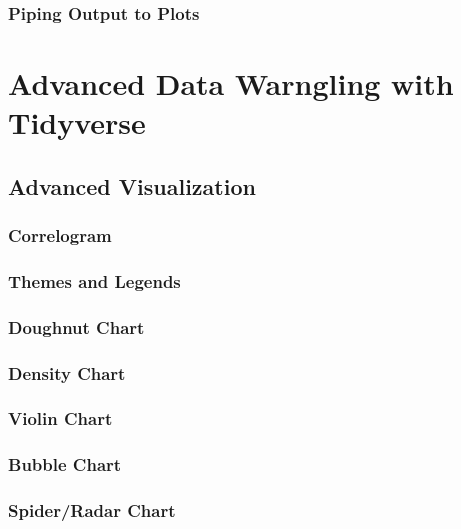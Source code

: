\documentclass[
]{book}
\begin{document}
\hypertarget{piping-output-to-plots}{%
\subsection{Piping Output to Plots}\label{piping-output-to-plots}}

\hypertarget{tidy-2}{%
\chapter{Advanced Data Warngling with Tidyverse}\label{tidy-2}}

\hypertarget{advanced-visualization}{%
\section{Advanced Visualization}\label{advanced-visualization}}

\hypertarget{correlogram}{%
\subsection{Correlogram}\label{correlogram}}

\hypertarget{themes-and-legends}{%
\subsection{Themes and Legends}\label{themes-and-legends}}

\hypertarget{doughnut-chart}{%
\subsection{Doughnut Chart}\label{doughnut-chart}}

\hypertarget{density-chart}{%
\subsection{Density Chart}\label{density-chart}}

\hypertarget{violin-chart}{%
\subsection{Violin Chart}\label{violin-chart}}

\hypertarget{bubble-chart}{%
\subsection{Bubble Chart}\label{bubble-chart}}

\hypertarget{spiderradar-chart}{%
\subsection{Spider/Radar Chart}\label{spiderradar-chart}}
\end{document}
